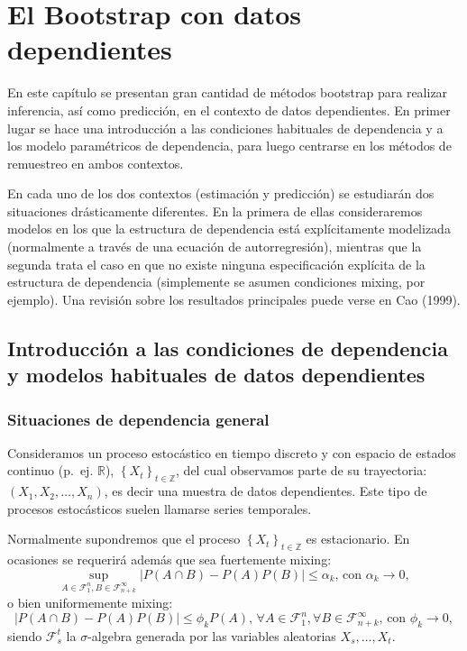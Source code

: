 \documentclass[
]{book}
\theoremstyle{definition}
\theoremstyle{definition}
\theoremstyle{definition}
\theoremstyle{remark}
\begin{document}
\hypertarget{cap9}{%
\chapter{El Bootstrap con datos dependientes}\label{cap9}}

En este capítulo se presentan gran cantidad de métodos bootstrap para
realizar inferencia, así como predicción, en el contexto de datos
dependientes. En primer lugar se hace una introducción a las condiciones
habituales de dependencia y a los modelo paramétricos de dependencia,
para luego centrarse en los métodos de remuestreo en ambos contextos.

En cada uno de los dos contextos (estimación y predicción) se estudiarán
dos situaciones drásticamente diferentes. En la primera de ellas
consideraremos modelos en los que la estructura de dependencia está
explícitamente modelizada (normalmente a través de una ecuación de
autorregresión), mientras que la segunda trata el caso en que no existe
ninguna especificación explícita de la estructura de dependencia
(simplemente se asumen condiciones mixing, por ejemplo). Una revisión
sobre los resultados principales puede verse en Cao (1999).

\hypertarget{introducciuxf3n-a-las-condiciones-de-dependencia-y-modelos-habituales-de-datos-dependientes}{%
\section{Introducción a las condiciones de dependencia y modelos habituales de datos dependientes}\label{introducciuxf3n-a-las-condiciones-de-dependencia-y-modelos-habituales-de-datos-dependientes}}

\hypertarget{situaciones-de-dependencia-general}{%
\subsection{Situaciones de dependencia general}\label{situaciones-de-dependencia-general}}

Consideramos un proceso estocástico en tiempo discreto y con espacio de
estados continuo (p.~ej. \(\mathbb{R}\)), \(\left\{X_{t}\right\}_{t\in \mathbb{Z}}\),
del cual observamos parte de su trayectoria: \(\left( X_1,X_2,\ldots ,X_n \right)\),
es decir una muestra de datos dependientes.
Este tipo de procesos estocásticos suelen llamarse series temporales.

Normalmente supondremos que el proceso
\(\left\{ X_{t}\right\}_{t\in \mathbb{Z}}\) es estacionario.
En ocasiones se requerirá además que sea fuertemente mixing:
\[\sup_{A\in \mathcal{F}_1^{n},B\in \mathcal{F}_{n+k}^{\infty }}\left\vert
P\left( A\cap B \right) -P\left( A \right) P(B) \right\vert \leq
\alpha _{k}\text{, con }\alpha _{k}\rightarrow 0,\]
o bien uniformemente mixing:
\[\left\vert P\left( A\cap B \right) -P\left( A \right) P(B) \right\vert 
\leq \phi _{k}P\left( A \right) \text{, }\forall A\in \mathcal{F}_1^{n},
\forall B\in \mathcal{F}_{n+k}^{\infty }\text{, con }\phi_{k}\rightarrow 0,\]
siendo \(\mathcal{F}_{s}^{t}\) la \(\sigma\)-algebra generada por las variables aleatorias
\(X_{s},\ldots ,X_{t}\).
\end{document}
